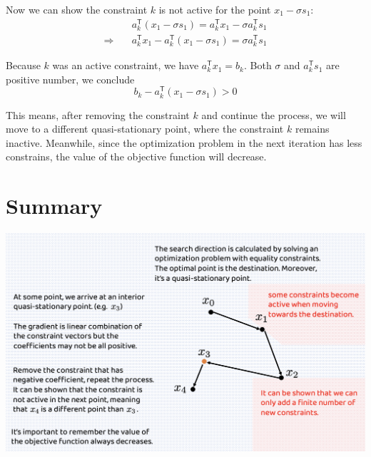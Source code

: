 \documentclass[letterpaper, oneside]{book}
\theoremstyle{definition}
\theoremstyle{remark}
\begin{document}
Now we can show the constraint $k$ is not active for the point $x_1 - \sigma  s_1$:
\begin{align*}
& a_k^{\mathsf{T}} (x_1 - \sigma s_1) = a_k^{\mathsf{T}} x_ 1 - \sigma a_k^{\mathsf{T}}s_1 \\
\Rightarrow \quad & a_k^{\mathsf{T}} x_ 1 - a_k^{\mathsf{T}} (x_1 - \sigma s_1) = \sigma a_k^{\mathsf{T}}s_1 
\end{align*}

Because $k$ was an active constraint, we have $a_k^{\mathsf{T}} x_ 1 = b_k$. Both $\sigma$ and $a_k^{\mathsf{T}}s_1$ are positive number, we conclude
\[
b_k - a_k^{\mathsf{T}} (x_1 - \sigma s_1) > 0
\]

This means, after removing the constraint $k$ and continue the process, we will move to a different quasi-stationary point, where the constraint $k$ remains inactive. Meanwhile, since the optimization problem in the next iteration has less constrains, the value of the objective function will decrease.

\section{Summary}
\begin{center}
	\includegraphics[width=\textwidth]{summary_of_process.png}
\end{center}
\end{document}
